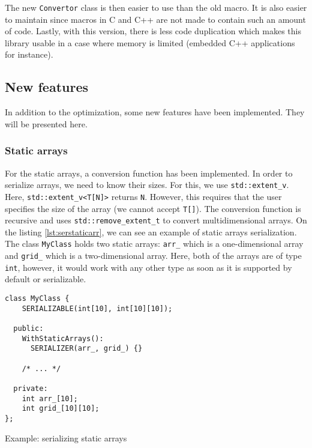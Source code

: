 The new \texttt{Convertor} class is then easier to use than the old macro. It
is also easier to maintain since macros in C and C++ are not made to contain
such an amount of code. Lastly, with this version, there is less code
duplication which makes this library usable in a case where memory is limited
(embedded C++ applications for instance).

\subsection{New features}

In addition to the optimization, some new features have been implemented. They
will be presented here.

\subsubsection{Static arrays}

For the static arrays, a conversion function has been implemented. In order to
serialize arrays, we need to know their sizes. For this, we use
\texttt{std::extent\_v}. Here, \texttt{std::extent\_v<T[N]>} returns \texttt{N}.
However, this requires that the user specifies the size of the array (we cannot
accept \texttt{T[]}). The conversion function is recursive and uses
\texttt{std::remove\_extent\_t} to convert multidimensional arrays. On the
listing \ref{lst:serstaticarr}, we can see an example of static arrays
serialization. The class \texttt{MyClass} holds two static arrays:
\texttt{arr\_} which is a one-dimensional array and \texttt{grid\_} which is a
two-dimensional array. Here, both of the arrays are of type \texttt{int},
however, it would work with any other type as soon as it is supported by default
or serializable.

\begin{listing}[ht!]
\begin{verbatim}
class MyClass {
    SERIALIZABLE(int[10], int[10][10]);

  public:
    WithStaticArrays():
      SERIALIZER(arr_, grid_) {}

    /* ... */

  private:
    int arr_[10];
    int grid_[10][10];
};
\end{verbatim}
\caption{Example: serializing static arrays}
\label{lst:serstaticarr}
\end{listing}

